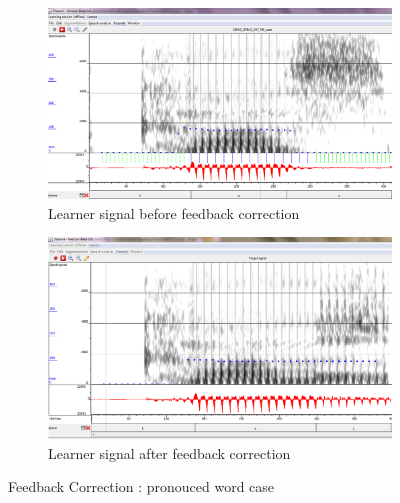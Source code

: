 \documentclass[11pt]{beamer}
\begin{document}
\begin{frame}
\begin{figure}
\begin{subfigure}{.5\textwidth}
  \centering
  \includegraphics[width=0.9\linewidth]{images/case_learner.PNG}
  \caption{Learner signal before feedback correction}
  \label{fig:sfig1}
\end{subfigure}%
\begin{subfigure}{.5\textwidth}
  \centering
  \includegraphics[width=0.9\linewidth]{images/case_target_2.PNG}
  \caption{Learner signal after feedback correction}
  \label{fig:sfig2}
\end{subfigure}
\caption{Feedback Correction : pronouced word case}
\label{fig:fig}
\end{figure}
\end{frame}
\end{document}
